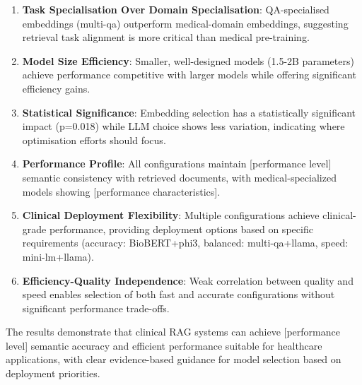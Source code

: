 \begin{enumerate}
    \item \textbf{Task Specialisation Over Domain Specialisation}: QA-specialised embeddings (multi-qa) outperform medical-domain embeddings, suggesting retrieval task alignment is more critical than medical pre-training.

    \item \textbf{Model Size Efficiency}: Smaller, well-designed models (1.5-2B parameters) achieve performance competitive with larger models while offering significant efficiency gains.

    \item \textbf{Statistical Significance}: Embedding selection has a statistically significant impact (p=0.018) while LLM choice shows less variation, indicating where optimisation efforts should focus.

    \item \textbf{Performance Profile}: All configurations maintain [performance level] semantic consistency with retrieved documents, with medical-specialized models showing [performance characteristics].

    \item \textbf{Clinical Deployment Flexibility}: Multiple configurations achieve clinical-grade performance, providing deployment options based on specific requirements (accuracy: BioBERT+phi3, balanced: multi-qa+llama, speed: mini-lm+llama).

    \item \textbf{Efficiency-Quality Independence}: Weak correlation between quality and speed enables selection of both fast and accurate configurations without significant performance trade-offs.
\end{enumerate}

The results demonstrate that clinical RAG systems can achieve [performance level] semantic accuracy and efficient performance suitable for healthcare applications, with clear evidence-based guidance for model selection based on deployment priorities.